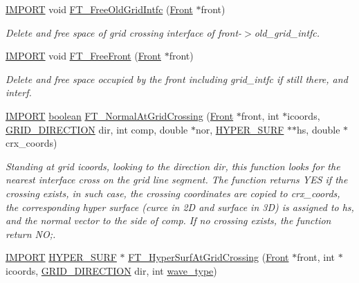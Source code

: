 \begin{DoxyCompactItemize}
\hyperlink{cdecs_8h_a773175d74e73776d69c3e538f17de1ee}{I\+M\+P\+O\+RT} void \hyperlink{group___g_r_i_d_i_n_t_f_c_gaff71f10a5ea191217f1fa302e8c14224}{F\+T\+\_\+\+Free\+Old\+Grid\+Intfc} (\hyperlink{fdecs_8h_ac32202b798f848095c489cfd04c4ca5f}{Front} $\ast$front)
\begin{DoxyCompactList}\small\item\em Delete and free space of grid crossing interface of front-\/$>$old\+\_\+grid\+\_\+intfc. \end{DoxyCompactList}\item 
\hyperlink{cdecs_8h_a773175d74e73776d69c3e538f17de1ee}{I\+M\+P\+O\+RT} void \hyperlink{group___g_r_i_d_i_n_t_f_c_gae8a4043d1a692d4650b0e70e08c481fa}{F\+T\+\_\+\+Free\+Front} (\hyperlink{fdecs_8h_ac32202b798f848095c489cfd04c4ca5f}{Front} $\ast$front)
\begin{DoxyCompactList}\small\item\em Delete and free space occupied by the front including grid\+\_\+intfc if still there, and interf. \end{DoxyCompactList}\item 
\hyperlink{cdecs_8h_a773175d74e73776d69c3e538f17de1ee}{I\+M\+P\+O\+RT} \hyperlink{cdecs_8h_ad048433382a936258fb49e2ec4f148e1}{boolean} \hyperlink{group___g_r_i_d_i_n_t_f_c_gaf48a7313099d778293353fdc04359f2b}{F\+T\+\_\+\+Normal\+At\+Grid\+Crossing} (\hyperlink{fdecs_8h_ac32202b798f848095c489cfd04c4ca5f}{Front} $\ast$front, int $\ast$icoords, \hyperlink{int_8h_aa7cc507beba6455174c0996f89fdc8c3}{G\+R\+I\+D\+\_\+\+D\+I\+R\+E\+C\+T\+I\+ON} dir, int comp, double $\ast$nor, \hyperlink{int_8h_acef50fa4757ce0d3f75c97fab5a175bc}{H\+Y\+P\+E\+R\+\_\+\+S\+U\+RF} $\ast$$\ast$hs, double $\ast$crx\+\_\+coords)
\begin{DoxyCompactList}\small\item\em Standing at grid icoords, looking to the direction dir, this function looks for the nearest interface cross on the grid line segment. The function returns Y\+ES if the crossing exists, in such case, the crossing coordinates are copied to crx\+\_\+coords, the corresponding hyper surface (curce in 2D and surface in 3D) is assigned to hs, and the normal vector to the side of comp. If no crossing exists, the function return NO;. \end{DoxyCompactList}\item 
\hyperlink{cdecs_8h_a773175d74e73776d69c3e538f17de1ee}{I\+M\+P\+O\+RT} \hyperlink{int_8h_acef50fa4757ce0d3f75c97fab5a175bc}{H\+Y\+P\+E\+R\+\_\+\+S\+U\+RF} $\ast$ \hyperlink{group___g_r_i_d_i_n_t_f_c_ga99a4412d35cf4e8ba70f40ee8e021213}{F\+T\+\_\+\+Hyper\+Surf\+At\+Grid\+Crossing} (\hyperlink{fdecs_8h_ac32202b798f848095c489cfd04c4ca5f}{Front} $\ast$front, int $\ast$icoords, \hyperlink{int_8h_aa7cc507beba6455174c0996f89fdc8c3}{G\+R\+I\+D\+\_\+\+D\+I\+R\+E\+C\+T\+I\+ON} dir, int \hyperlink{fuserint_8h_aff856283a1093533d99780203d6d3e65}{wave\+\_\+type})
$$
\end{DoxyCompactItemize}
